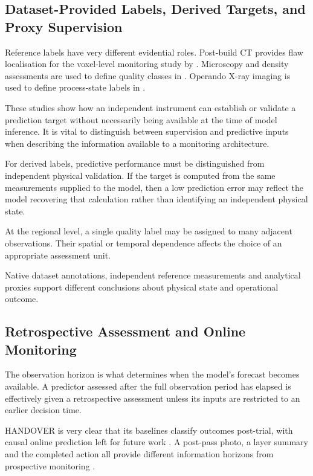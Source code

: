 \subsection{Dataset-Provided Labels, Derived Targets, and Proxy Supervision}

Reference labels have very different evidential roles. Post-build CT provides flaw localisation for
the voxel-level monitoring study by \textcite{Petrich2021Multimodal}. Microscopy and
density assessments are used to define quality classes in \textcite{Li2022A}. Operando X-ray
imaging is used to define process-state labels in \textcite{Pandiyan2022Deep}.

These studies show how an independent instrument can establish or validate a prediction target
without necessarily being available at the time of model inference. It is vital to distinguish
between supervision and predictive inputs when describing the information available to a monitoring
architecture.

For derived labels, predictive performance must be distinguished from independent physical
validation. If the target is computed from the same measurements supplied to the model, then a low
prediction error may reflect the model recovering that calculation rather than identifying an
independent physical state.

At the regional level, a single quality label may be assigned to many adjacent observations. Their
spatial or temporal dependence affects the choice of an appropriate assessment unit.

Native dataset annotations, independent reference measurements and analytical proxies support different conclusions about physical state and operational outcome.

\subsection{Retrospective Assessment and Online Monitoring}

The observation horizon is what determines when the model's forecast becomes available. A predictor
assessed after the full observation period has elapsed is effectively given a retrospective
assessment unless its inputs are restricted to an earlier decision time.

HANDOVER is very clear that its baselines classify outcomes post-trial, with causal online
prediction left for future work \parencite[Sections~VI--VII]{Thoduka2024Handover}. A
post-pass photo, a layer summary and the completed action all provide different information horizons
from prospective monitoring \parencite{P045,Petrich2021Multimodal}.


